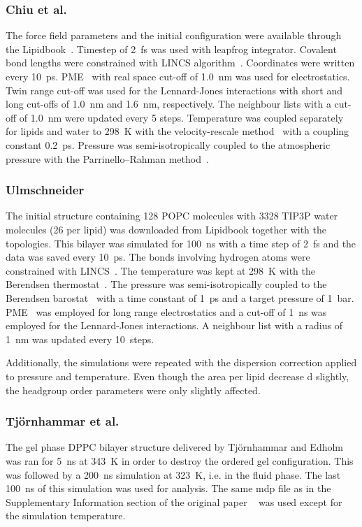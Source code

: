 \documentclass[journal=jacsat,manuscript=article]{achemso}
\begin{document}
\subsubsection{Chiu et al.}
The force field parameters and the initial configuration were available through the Lipidbook~\cite{domanski10}.
Timestep of 2~fs was used with leapfrog integrator. Covalent bond lengths were constrained with LINCS algorithm~\cite{hess97,hess07}. 
Coordinates were written every 10~ps. PME~\cite{darden93,essman95} with real space cut-off of 1.0~nm was used 
for electrostatics. Twin range cut-off was used for the Lennard-Jones interactions with short and long cut-offs of 1.0~nm and 1.6~nm, respectively.
The neighbour lists with a cut-off of 1.0~nm were updated every 5 steps. Temperature was coupled separately
for lipids and water to 298~K with the velocity-rescale method~\cite{bussi07} with a coupling constant 0.2~ps.
Pressure was semi-isotropically coupled to the atmospheric pressure with the Parrinello--Rahman method~\cite{parrinello81}.

\subsubsection{Ulmschneider}
The initial structure containing 128 POPC molecules with 3328 TIP3P water~\cite{jorgensen83} molecules (26 per lipid) was downloaded from Lipidbook \cite{domanski10} 
together with the topologies. This bilayer was simulated for 100~ns with a time step of 2~fs and the data was saved every 10~ps. The bonds involving hydrogen atoms were 
constrained with LINCS~\cite{hess97,hess07}. The temperature was kept at 298~K with the Berendsen thermostat~\cite{berendsen84}. The pressure was semi-isotropically coupled to the Berendsen 
barostat~\cite{berendsen84} with a time constant of 1~ps and a target pressure of 1~bar. PME~\cite{darden93,essman95} was employed for long range electrostatics and a cut-off of 1~ns was employed for 
the Lennard-Jones interactions. A neighbour list with a radius of 1~nm was updated every 10~steps. 

Additionally, the simulations were repeated with the dispersion correction applied to pressure and temperature. Even though the area per lipid decrease
d slightly, the headgroup order parameters were only slightly affected.

\subsubsection{Tj\"ornhammar et al.}
The gel phase DPPC bilayer structure delivered by Tj\"ornhammar  and Edholm~\cite{tjornhammar14} was ran for 5~ns at 343~K in order to destroy the 
ordered gel configuration. This was followed by a 200~ns simulation at 323~K, i.e. in the fluid phase. The last 100~ns of this simulation was used for analysis. 
The same mdp file as in the Supplementary Information section of the original paper ~\cite{tjornhammar14} was used except for the simulation temperature.
\end{document}
